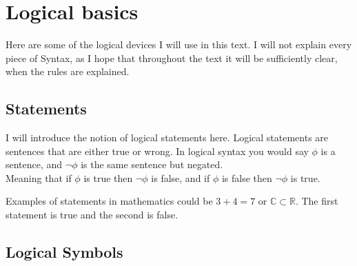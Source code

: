 \chapter{Logical basics}

Here are some of the logical devices I will use in this text. I will not explain every piece of Syntax, as I hope that throughout the text it will be sufficiently clear, when the rules are explained.

\section{Statements}

I will introduce the notion of logical statements here. Logical statements are sentences that are either true or wrong. In logical syntax you would say $\phi$ is a sentence, and $\neg\phi$ is the same sentence but negated. \\
Meaning that if $\phi$ is true then $\neg\phi$ is false, and if $\phi$ is false then $\neg\phi$ is true. 

Examples of statements in mathematics could be $3 + 4 = 7$ or $\mathbb{C}\subset\mathbb{R}$. The first statement is true and the second is false.

\section{Logical Symbols}

